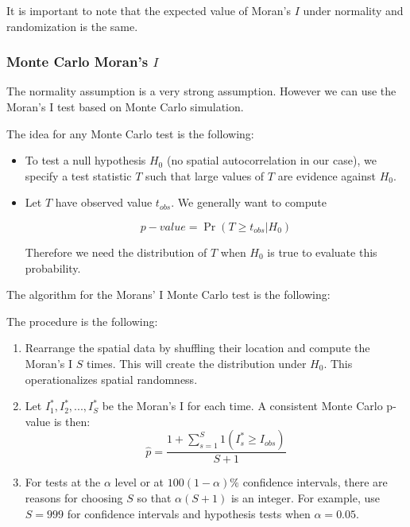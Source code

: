 \documentclass[english,12pt]{book}\usepackage[]{graphicx}\usepackage[]{xcolor}
\begin{document}
It is important to note that the expected value of Moran's $I$ under normality and randomization is the same. 

\subsubsection{Monte Carlo Moran's $I$}

The normality assumption is a very strong assumption. However we can use the Moran’s I test based on Monte Carlo simulation.

The idea for any Monte Carlo test is the following: 

\begin{itemize}
  \item To test a null hypothesis $H_0$ (no spatial autocorrelation in our case), we specify a test statistic $T$ such that large values of $T$ are evidence against $H_0$.
  \item Let $T$ have observed value $t_{obs}$. We generally want to compute
  
  \begin{equation}
    p-value = \Pr(T\geq t_{obs}|H_0)
  \end{equation}
  
  Therefore we need the distribution of $T$ when $H_0$ is true to evaluate this probability.
\end{itemize}

The algorithm for the Morans' I Monte Carlo test is the following:

\begin{algorithm}
The procedure is the following:

\begin{enumerate}
\item Rearrange the spatial data by shuffling their location and compute the Moran's I $S$ times. This will create the distribution under $H_0$. This operationalizes spatial randomness. 
\item Let $I_1^*, I_2^*,..., I_S^*$ be the Moran's I for each time. A consistent Monte Carlo p-value is then:
  \begin{equation}
    \widehat{p} = \frac{1 + \sum_{s=1}^S 1(I^*_s \geq I_{obs})}{S + 1}
  \end{equation}
  \item For tests at the $\alpha$ level or at $100(1- \alpha)\%$ confidence intervals, there are reasons for choosing $S$ so that $\alpha(S + 1)$ is an integer. For example, use $S=999$ for confidence intervals and hypothesis tests when $\alpha = 0.05$.
\end{enumerate}
\end{algorithm}
\end{document}
